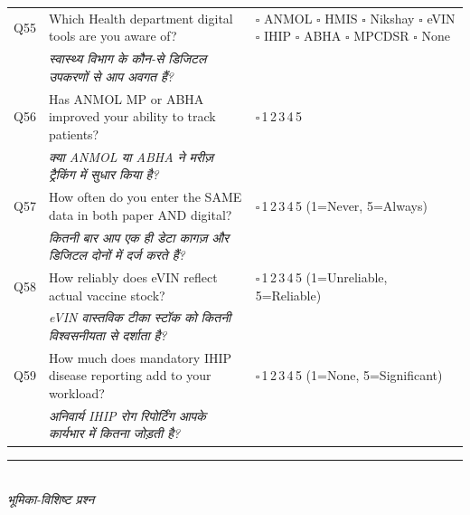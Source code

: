 \documentclass[10pt,a4paper]{article}
\newcommand{\likert}{{\Large$\square$}\,1\quad{\Large$\square$}\,2\quad{\Large$\square$}\,3\quad{\Large$\square$}\,4\quad{\Large$\square$}\,5}
\begin{document}
\noindent\begin{tabularx}{\textwidth}{@{}L{0.8cm} X L{5.2cm}@{}}
Q55 & Which Health department digital tools are you aware of? & {\Large$\square$} ANMOL {\Large$\square$} HMIS {\Large$\square$} Nikshay {\Large$\square$} eVIN {\Large$\square$} IHIP {\Large$\square$} ABHA {\Large$\square$} MPCDSR {\Large$\square$} None \\
 & {\hindifont\small\itshape\color{black!70} स्वास्थ्य विभाग के कौन-से डिजिटल उपकरणों से आप अवगत हैं?} & \\[3pt]
Q56 & Has ANMOL MP or ABHA improved your ability to track patients? & \likert \\
 & {\hindifont\small\itshape\color{black!70} क्या ANMOL या ABHA ने मरीज़ ट्रैकिंग में सुधार किया है?} & \\[3pt]
Q57 & How often do you enter the SAME data in both paper AND digital? & \likert{} {\scriptsize(1=Never, 5=Always)} \\
 & {\hindifont\small\itshape\color{black!70} कितनी बार आप एक ही डेटा कागज़ और डिजिटल दोनों में दर्ज करते हैं?} & \\[3pt]
Q58 & How reliably does eVIN reflect actual vaccine stock? & \likert{} {\scriptsize(1=Unreliable, 5=Reliable)} \\
 & {\hindifont\small\itshape\color{black!70} eVIN वास्तविक टीका स्टॉक को कितनी विश्वसनीयता से दर्शाता है?} & \\[3pt]
Q59 & How much does mandatory IHIP disease reporting add to your workload? & \likert{} {\scriptsize(1=None, 5=Significant)} \\
 & {\hindifont\small\itshape\color{black!70} अनिवार्य IHIP रोग रिपोर्टिंग आपके कार्यभार में कितना जोड़ती है?} & \\[3pt]
\end{tabularx}
\newpage
\noindent\rule{\textwidth}{0.3pt}\vspace{3pt}
\\
{\hindifont\itshape\color{black!70} भूमिका-विशिष्ट प्रश्न}\vspace{3pt}
\end{document}
